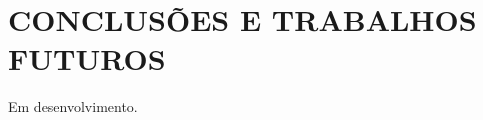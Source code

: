 \chapter{CONCLUSÕES E TRABALHOS FUTUROS}\label{chap:conclusoes-e-trabalhos-futuros}

Em desenvolvimento.




